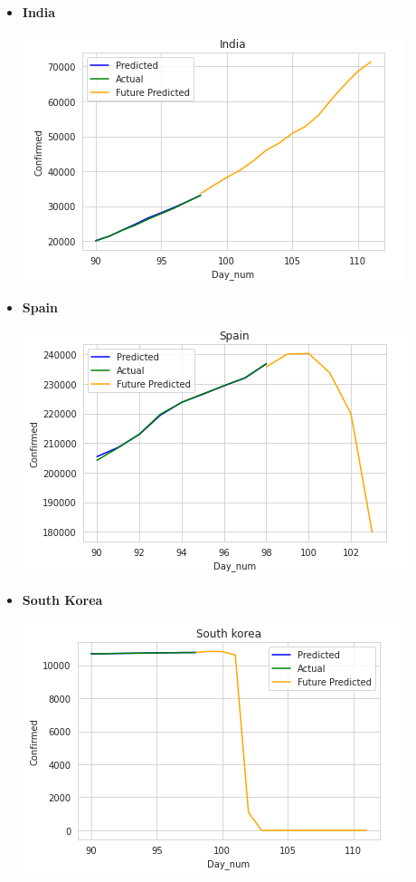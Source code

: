 \documentclass{article}
\begin{document}
\begin{itemize}
\item \textbf{India}
\begin{center}
\includegraphics[scale=0.5]{corona_6_india.png}
\end{center}
\item \textbf{Spain}
\begin{center}
\includegraphics[scale=0.5]{corona__5_spain.png}
\end{center}
\item \textbf{South Korea}
\begin{center}
\includegraphics[scale=0.5]{corona_7_southkorea.png}

\end{center}
\end{itemize}
\end{document}
